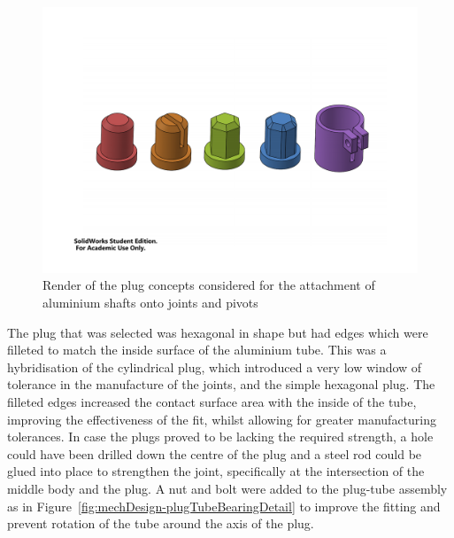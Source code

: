         \begin{figure}
        \centering
        \includegraphics[clip, trim=3cm 6cm 3cm 6cm, width=1\linewidth]{figures/plug-concepts}
        \caption[Render of the plug concepts considered for the attachment of aluminium shafts onto joints and pivots]{Render of the plug concepts considered for the attachment of aluminium shafts onto joints and pivots}
        \label{fig:mechDesign-plugConcepts}
        \end{figure}
        
        
        The plug that was selected was hexagonal in shape but had edges which were filleted to match the inside surface of the aluminium tube. This was a hybridisation of the cylindrical plug, which introduced a very low window of tolerance in the manufacture of the joints, and the simple hexagonal plug. The filleted edges increased the contact surface area with the inside of the tube, improving the effectiveness of the fit, whilst allowing for greater manufacturing tolerances. In case the plugs proved to be lacking the required strength, a hole could have been drilled down the centre of the plug and a steel rod could be glued into place to strengthen the joint, specifically at the intersection of the middle body and the plug. A nut and bolt were added to the plug-tube assembly as in Figure~\ref{fig:mechDesign-plugTubeBearingDetail} to improve the fitting and prevent rotation of the tube around the axis of the plug.
        
